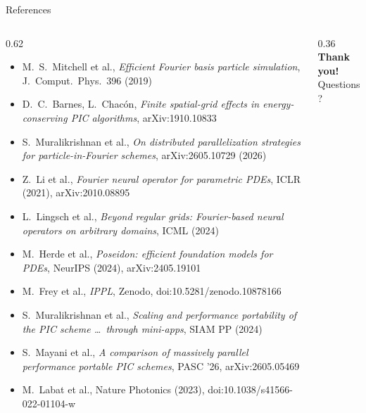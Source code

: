 \documentclass[aspectratio=169]{beamer}
\begin{document}
\begin{frame}{References}
\begin{columns}[c]
\begin{column}{0.62\textwidth}
\tiny
\begin{itemize}\setlength{\itemsep}{0pt}
\item M.~S.~Mitchell et al., \emph{Efficient Fourier basis particle simulation}, J.\ Comput.\ Phys.\ 396 (2019)
\item D.~C.~Barnes, L.~Chac\'on, \emph{Finite spatial-grid effects in energy-conserving PIC algorithms}, arXiv:1910.10833
\item S.~Muralikrishnan et al., \emph{On distributed parallelization strategies for particle-in-Fourier schemes}, arXiv:2605.10729 (2026)

\item Z.~Li et al., \emph{Fourier neural operator for parametric PDEs}, ICLR (2021), arXiv:2010.08895
\item L.~Lingsch et al., \emph{Beyond regular grids: Fourier-based neural operators on arbitrary domains}, ICML (2024)
\item M.~Herde et al., \emph{Poseidon: efficient foundation models for PDEs}, NeurIPS (2024), arXiv:2405.19101

\item M.~Frey et al., \emph{IPPL}, Zenodo, doi:10.5281/zenodo.10878166
\item S.~Muralikrishnan et al., \emph{Scaling and performance portability of the PIC scheme \ldots\ through mini-apps}, SIAM PP (2024)
\item S.~Mayani et al., \emph{A comparison of massively parallel performance portable PIC schemes}, PASC '26, arXiv:2605.05469
\item M.~Labat et al., Nature Photonics (2023), doi:10.1038/s41566-022-01104-w

\end{itemize}
\end{column}
\begin{column}{0.36\textwidth}
\centering
{\huge\color{fzjblue}\textbf{Thank you!}}\\[8pt]
{\large Questions?}
\end{column}
\end{columns}
\end{frame}
\end{document}
